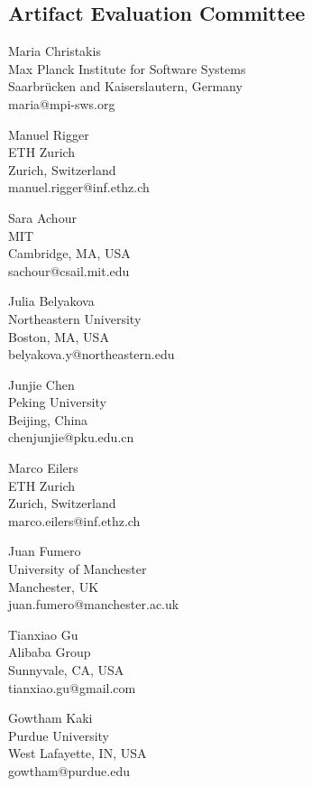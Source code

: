 \documentclass[a4paper,UKenglish]{dartsmaster-v2019}
\begin{document}
\begin{participants}

\chapter[Committee]{Artifact Evaluation Committee}

\participant Maria Christakis\\
	Max Planck Institute for Software Systems\\
	Saarbrücken and Kaiserslautern, Germany\\
	maria@mpi-sws.org

\participant Manuel Rigger\\
	ETH Zurich\\
	Zurich, Switzerland\\
	manuel.rigger@inf.ethz.ch

\participant Sara Achour\\
  MIT\\
  Cambridge, MA, USA\\
  sachour@csail.mit.edu

\participant Julia Belyakova\\
	Northeastern University\\
	Boston, MA, USA\\
	belyakova.y@northeastern.edu

\participant Junjie Chen\\
	Peking University\\
	Beijing, China\\
	chenjunjie@pku.edu.cn

\participant Marco Eilers\\
	ETH Zurich\\
	Zurich, Switzerland\\
	marco.eilers@inf.ethz.ch

\participant Juan Fumero\\
	University of Manchester\\
	Manchester, UK\\
	juan.fumero@manchester.ac.uk

\participant Tianxiao Gu\\
	Alibaba Group\\
	Sunnyvale, CA, USA\\
	tianxiao.gu@gmail.com

\participant Gowtham Kaki\\
	Purdue University\\
	West Lafayette, IN, USA\\
	gowtham@purdue.edu


\end{participants}
\end{document}
